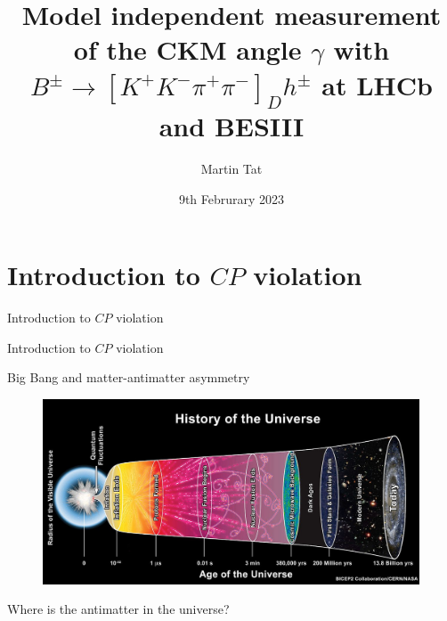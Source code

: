 \documentclass{beamer}
\title[$B^\pm\to{[K^+K^-\pi^+\pi^-]}_Dh^\pm$]{Model independent measurement of the CKM angle \texorpdfstring{$\gamma$}{gamma} with \texorpdfstring{$B^\pm\to[K^+K^-\pi^+\pi^-]_Dh^\pm$}{B2DhD2KKpipi} at LHCb and BESIII}
\author{Martin Tat}
\institute[University of Oxford]{\normalsize University of Oxford\\ \vspace{0.3cm}\normalsize Warwick EPP Seminar}
\date{9th Februrary 2023}
\begin{document}
\begin{frame}
  \titlepage
\end{frame}


\section{Introduction to \texorpdfstring{$C\!P$}{CP} violation}
\begin{frame}{Introduction to $C\!P$ violation}
  \begin{center}
    {\huge Introduction to $C\!P$ violation}
  \end{center}
\end{frame}

\begin{frame}{Big Bang and matter-antimatter asymmetry}
  \begin{figure}
    \includegraphics[height=5.5cm]{Plots/BigBangHistory.jpg}
  \end{figure}
  \begin{center}
    \Large Where is the antimatter in the universe?
  \end{center}
\end{frame}
\end{document}

